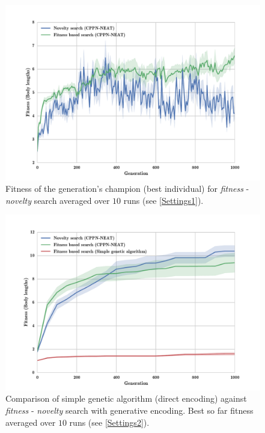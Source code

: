 \begin{figure}[h!]
\centering
\includegraphics[width=1.0\textwidth]{../Figures/Results/AvgGenerChampNoveltyFitnessSize5.pdf}
\caption{Fitness of the generation's champion (best individual) for \emph{fitness} - \emph{novelty} search averaged over $10$ runs (see \ref{Settings1}).}
\label{fig:AvgGenerChampNoveltyFitnessSize5}
\end{figure}

\begin{figure}[h!]
\centering
\includegraphics[width=1.0\textwidth]{../Figures/Results/FitvsNovVsDirSize10.pdf}
\caption{Comparison of simple genetic algorithm (direct encoding) against \emph{fitness} - \emph{novelty} search with generative encoding. Best so far fitness averaged over $10$ runs (see \ref{Settings2}).}
\label{fig:FitvsNovVsDirSize10}
\end{figure}

